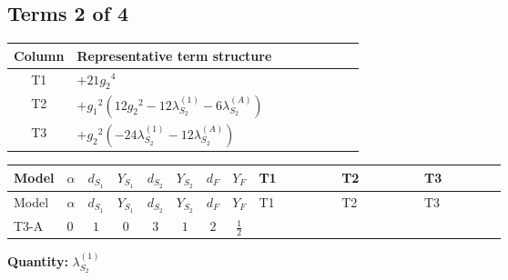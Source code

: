 \documentclass[8pt]{article}
\begin{document}
\begin{landscape}
\subsection*{Terms 2 of 4}
\begin{center}
\begin{tabular}{@{}c >{\raggedright\arraybackslash}p{0.82\linewidth}@{}}
\toprule
Column & Representative term structure \\
\midrule
T1 & \(\displaystyle +21 {g_2}^4\) \\
\midrule
T2 & \(\displaystyle +{g_1}^2 \left(12 {g_2}^2-12 {\lambda_{S_2}^{(1)}}-6 {\lambda_{S_2}^{(A)}}\right)\) \\
\midrule
T3 & \(\displaystyle +{g_2}^2 (-24 {\lambda_{S_2}^{(1)}}-12 {\lambda_{S_2}^{(A)}})\) \\
\midrule
\bottomrule
\end{tabular}
\end{center}
\smallskip
\tiny
\begin{longtable}{@{}llcccccc >{\raggedright\arraybackslash}p{0.21\linewidth} >{\raggedright\arraybackslash}p{0.21\linewidth} >{\raggedright\arraybackslash}p{0.21\linewidth}@{}}
\toprule
Model & $\alpha$ & $d_{S_1}$ & $Y_{S_1}$ & $d_{S_2}$ & $Y_{S_2}$ & $d_F$ & $Y_F$ & T1 & T2 & T3 \\
\midrule
\endfirsthead
\toprule
Model & $\alpha$ & $d_{S_1}$ & $Y_{S_1}$ & $d_{S_2}$ & $Y_{S_2}$ & $d_F$ & $Y_F$ & T1 & T2 & T3 \\
\midrule
\endhead
T3-A & $0$ & $1$ & $0$ & $3$ & $1$ & $2$ & $\frac{1}{2}$ & \scriptsize\adjustbox{max width=\linewidth}{$\begin{gathered} +21 {g_2}^4\end{gathered}$} & \scriptsize\adjustbox{max width=\linewidth}{$\begin{gathered} +{g_1}^2 \left(12 {g_2}^2-12 {\lambda_{S_2}^{(1)}}-6 {\lambda_{S_2}^{(A)}}\right)\end{gathered}$} & \scriptsize\adjustbox{max width=\linewidth}{$\begin{gathered} +{g_2}^2 (-24 {\lambda_{S_2}^{(1)}}-12 {\lambda_{S_2}^{(A)}})\end{gathered}$} \\
\midrule
\bottomrule
\end{longtable}
\clearpage
\noindent\textbf{Quantity: }$\lambda_{S_2}^{(1)}$\par\smallskip

\end{landscape}
\end{document}

